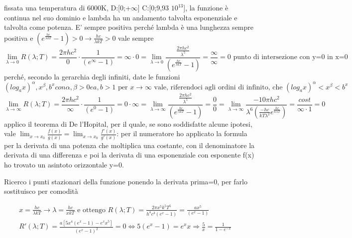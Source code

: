 \documentclass{article}
\theoremstyle{definition}
\begin{document}
fissata una temperatura di 6000K, D:[0;+\(\infty\)]   C:[0;9,93 \(10^{13}\)],
la funzione è continua nel suo dominio e lambda ha un andamento talvolta esponenziale e talvolta come potenza. E' sempre positiva perché lambda è una lunghezza sempre positiva e \(\left (e^{\frac{hc}{\lambda kT}}-1\right )>0\rightarrow \frac{hc}{\lambda kT}>0\) vale sempre
\begin{equation}
\lim_{\lambda \rightarrow 0} R(\lambda ;T)=\frac{2\pi h c^{2}}{0} \cdot \frac{1}{\left (e^{\infty }-1  \right )}=    \infty\cdot 0=\lim_{\lambda \rightarrow 0}\frac{\frac{2\pi h c^{2}}{\lambda ^{5}}}{\left ( e^{\frac{hc}{\lambda kT}}-1\right )}=\frac{\infty}{\infty}=0 \text{    punto di intersezione con y=0 in x=0}
\end{equation}
perché, secondo la gerarchia degli infiniti, date le funzioni
\begin{equation}
\left ( log_{a}x \right )^{\alpha }, x^{\beta }, b^{x} con \alpha ,\beta > 0 e a,b > 1 \text{    per   } x\rightarrow \infty 
\text{   vale, riferendoci agli ordini di infinito, che   }
\left ( log_{a}x \right )^{\alpha }<x^{\beta }<b^{x}
\end{equation}
\begin{equation}
\lim_{\lambda \rightarrow \infty }R(\lambda ;T)=\frac{2\pi h c^{2}}{\infty} \cdot \frac{1}{\left (e^{0 }-1  \right )} =  0\cdot \infty=\lim_{\lambda \rightarrow \infty}\frac{\frac{2\pi h c^{2}}{\lambda ^{5}}}{\left ( e^{\frac{hc}{\lambda kT}}-1\right )}=\frac{0}{0} =\lim_{\lambda \rightarrow \infty }\frac{-10\pi hc^{2}}{\lambda ^{6}\left ( \frac{-hc}{kT\lambda^{2}}e^{\frac{hc}{k\lambda T}} \right )}=\frac{cost}{\infty \cdot 1}=0
\end{equation}
applico il teorema di De l'Hopital, per il quale, se sono soddisfatte alcune ipotesi, vale \(\lim_{x\rightarrow x_{0}}\frac{f(x)}{g(x)}=\lim_{x\rightarrow x_{0}}\frac{f'(x)}{g'(x)}\):  per il numeratore ho applicato la formula per la derivata di una potenza che moltiplica una costante, con il denominatore la derivata di una differenza e poi la derivata di una esponenziale con esponente f(x)\\
ho trovato un asintoto orizzontale y=0.

Ricerco i punti stazionari della funzione ponendo la derivata prima=0, per farlo sostituisco per comodità

\begin{align*}
&x=\frac{h c}{\lambda k T}\rightarrow \lambda =\frac{h c}{x k T} \text{   e ottengo   }
R(\lambda ;T)=\frac{2\pi x^{5}k^{5}T^{5}}{h^{4}c^{3}\left ( e^{x}-1 \right )}=\frac{a x^{5}}{\left ( e^{x}-1 \right )}\\
&R'(\lambda ;T)=\frac{a\left [ 5x^{4}\left ( e^{x}-1 \right )-e^{x}x^{5}\right ]}{\left ( e^{x}-1 \right )^{2}}=0 \Leftrightarrow 5\left ( e^{x}-1 \right )=e^{x}x\Rightarrow \frac{5}{x}=\frac{1}{1-e^{-x}} \qquad
\end{align*}
\end{document}
